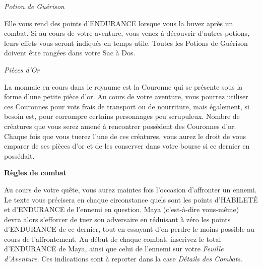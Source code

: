 \documentclass[10pt]{book}
\begin{document}
\begin{center}
  \textit{Potion de Guérison}
\end{center}
Elle vous rend des points d'ENDURANCE lorsque vous la buvez après un combat.
Si au cours de votre aventure, vous venez à découvrir d'autres potions, leurs
effets vous seront indiqués en temps utile. Toutes les Potions de Guérison
doivent être rangées dans votre Sac à Dos.\\

\begin{center}
  \textit{Pièces d'Or}
\end{center}
La monnaie en cours dans le royaume est la Couronne qui se présente sous la forme
d'une petite pièce d'or. Au cours de votre aventure, vous pourrez utiliser ces
Couronnes pour vots frais de transport ou de nourriture, mais également, si besoin
est, pour corrompre certains personnages peu scrupuleux. Nombre de créatures que vous
serez amené à rencontrer possèdent des Couronnes d'or. Chaque fois que vous tuerez
l'une de ces créatures, vous aurez le droit de vous emparer de ses pièces d'or et de
les conserver dans votre bourse si ce dernier en possédait.\\

\newpage

\begin{center}
  \textbf{Règles de combat}
\end{center}
Au cours de votre quête, vous aurez maintes fois l'occasion d'affronter un ennemi. Le texte
vous précisera en chaque circonstance quels sont les points d'HABILETÉ et d'ENDURANCE de
l'ennemi en question. Maya (c'est-à-dire vous-même) devra alors s'efforcer de tuer son
adversaire en réduisant à zéro les points d'ENDURANCE de ce dernier, tout en essayant d'en perdre
le moins possible au cours de l'affrontement. Au début de
chaque combat, inscrivez le total d'ENDURANCE de Maya, ainsi que celui de l'ennemi sur
votre \textit{Feuille d'Aventure}. Ces indications sont à reporter dans la case
\textit{Détails des Combats}.\\
\end{document}
